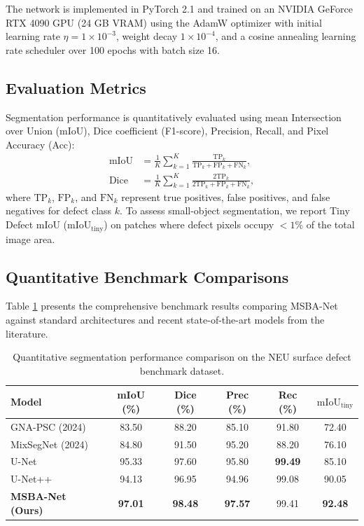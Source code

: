 \documentclass[10pt,a4paper]{article}
\begin{document}
The network is implemented in PyTorch 2.1 and trained on an NVIDIA GeForce RTX 4090 GPU (24 GB VRAM) using the AdamW optimizer with initial learning rate $\eta = 1 \times 10^{-3}$, weight decay $1 \times 10^{-4}$, and a cosine annealing learning rate scheduler over 100 epochs with batch size 16.

\subsection{Evaluation Metrics}
Segmentation performance is quantitatively evaluated using mean Intersection over Union (mIoU), Dice coefficient (F1-score), Precision, Recall, and Pixel Accuracy (Acc):
\begin{align}
  \text{mIoU} &= \frac{1}{K}\sum_{k=1}^K \frac{\text{TP}_k}{\text{TP}_k + \text{FP}_k + \text{FN}_k}, \\
  \text{Dice} &= \frac{1}{K}\sum_{k=1}^K \frac{2\text{TP}_k}{2\text{TP}_k + \text{FP}_k + \text{FN}_k},
\end{align}
where $\text{TP}_k$, $\text{FP}_k$, and $\text{FN}_k$ represent true positives, false positives, and false negatives for defect class $k$. To assess small-object segmentation, we report Tiny Defect mIoU ($\text{mIoU}_{\text{tiny}}$) on patches where defect pixels occupy $<1\%$ of the total image area.

\subsection{Quantitative Benchmark Comparisons}
Table \ref{tab:benchmark} presents the comprehensive benchmark results comparing MSBA-Net against standard architectures and recent state-of-the-art models from the literature.

\begin{table}[h]
  \centering
  \fontsize{8.5pt}{10.5pt}\selectfont
  \caption{Quantitative segmentation performance comparison on the NEU surface defect benchmark dataset.}
  \label{tab:benchmark}
  \begin{tabular*}{\columnwidth}{@{\extracolsep{\fill}}lccccc@{}}
    \toprule
    Model & mIoU (\%) & Dice (\%) & Prec (\%) & Rec (\%) & $\text{mIoU}_{\text{tiny}}$ \\
    \midrule
    GNA-PSC (2024) \cite{gnapsc2024} & 83.50 & 88.20 & 85.10 & 91.80 & 72.40 \\
    MixSegNet (2024) \cite{mixsegnet2024} & 84.80 & 91.50 & 95.20 & 88.20 & 76.10 \\
    U-Net \cite{unet2015} & 95.33 & 97.60 & 95.80 & \textbf{99.49} & 85.10 \\
    U-Net++ \cite{unetpp2018} & 94.13 & 96.95 & 94.96 & 99.08 & 90.05 \\
    \textbf{MSBA-Net (Ours)} & \textbf{97.01} & \textbf{98.48} & \textbf{97.57} & 99.41 & \textbf{92.48} \\
    \bottomrule
  \end{tabular*}
\end{table}
\end{document}
